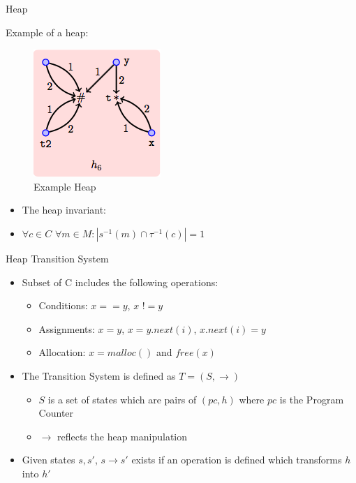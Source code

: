 \begin{frame}[fragile]{Heap}
    
    \pause
    Example of a heap:
    \pause
    
    \begin{figure}
        \includegraphics[scale=0.57]{images/Heap6Example.png}
        \\ \tiny{Example Heap \cite{abdulla2013monotonic}}
    \end{figure}

    \pause

    \begin{itemize}
        \item The heap invariant: 
        \item <5-> $\forall c \in C$ $\forall m \in M : |s^{-1}(m) \cap \tau^{-1}(c)| = 1$ \\
    \end{itemize}
\end{frame}

\begin{frame}[fragile]{Heap Transition System}
    
    \pause

    \begin{itemize}
        \item <2-> Subset of C includes the following operations: 
            \begin{itemize}
                \item <3-> Conditions: $x == y$, $x$ !$= y$
                \item <4-> Assignments: $x = y$, $x = y.next(i)$, $x.next(i) = y$
                \item <5-> Allocation: $x = malloc()$ and $free(x)$
            \end{itemize}
        \item <6-> The Transition System is defined as $T = (S, \rightarrow)$
            \begin{itemize}
                \item <7-> $S$ is a set of states which are pairs of $(pc, h)$ where $pc$ is the Program Counter
                \item <8-> $\rightarrow$ reflects the heap manipulation
            \end{itemize}
        \item <9-> Given states $s, s'$, $s \rightarrow s'$ exists if an operation is defined which transforms $h$ into $h'$ 
    \end{itemize}


\end{frame}

